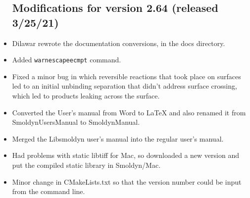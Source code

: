\documentclass {scrbook}
\newcommand {\ttt} {\texttt}
\begin{document}
\begin{itemize}
\subsection*{Modifications for version 2.64 (released 3/25/21)}
\item Dilawar rewrote the documentation conversions, in the docs directory.
\item Added \ttt{warnescapeecmpt} command.
\item Fixed a minor bug in which reversible reactions that took place on surfaces led to an initial unbinding separation that didn't address surface crossing, which led to products leaking across the surface.
\item Converted the User's manual from Word to LaTeX and also renamed it from SmoldynUsersManual to SmoldynManual.
\item Merged the Libsmoldyn user's manual into the regular user's manual.
\item Had problems with static libtiff for Mac, so downloaded a new version and put the compiled static library in Smoldyn/Mac.
\item Minor change in CMakeLists.txt so that the version number could be input from the command line.


\end{itemize}
\end{document}

